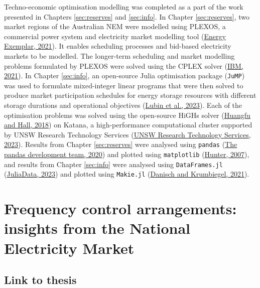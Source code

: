 \documentclass[12pt,a4paper,]{report}
\begin{document}
Techno-economic optimisation modelling was completed as a part of the
work presented in Chapters \ref{sec:reserves} and \ref{sec:info}. In
Chapter \ref{sec:reserves}, two market regions of the Australian NEM
were modelled using PLEXOS, a commercial power system and electricity
market modelling tool
(\protect\hyperlink{ref-energyexemplarPLEXOSEnergyMarket2021}{Energy
Exemplar, 2021}). It enables scheduling processes and bid-based
electricity markets to be modelled. The longer-term scheduling and
market modelling problems formulated by PLEXOS were solved using the
CPLEX solver (\protect\hyperlink{ref-ibmCPLEXOptimizer2021}{IBM, 2021}).
In Chapter \ref{sec:info}, an open-source Julia optimisation package
(\texttt{JuMP}) was used to formulate mixed-integer linear programs that
were then solved to produce market participation schedules for energy
storage resources with different storage durations and operational
objectives
(\protect\hyperlink{ref-lubinJuMPRecentImprovements2023}{Lubin et al.,
2023}). Each of the optimisation problems was solved using the
open-source HiGHs solver
(\protect\hyperlink{ref-huangfuParallelizingDualRevised2018}{Huangfu and
Hall, 2018}) on Katana, a high-performance computational cluster
supported by UNSW Research Technology Services
(\protect\hyperlink{ref-unswresearchtechnologyservicesKatana2023}{UNSW
Research Technology Services, 2023}). Results from Chapter
\ref{sec:reserves} were analysed using \texttt{pandas}
(\protect\hyperlink{ref-reback2020pandas}{The pandas development team,
2020}) and plotted using \texttt{matplotlib}
(\protect\hyperlink{ref-hunterMatplotlib2DGraphics2007}{Hunter, 2007}),
and results from Chapter \ref{sec:info} were analysed using
\texttt{DataFrames.jl}
(\protect\hyperlink{ref-juliadataDataFramesJl2023}{JuliaData, 2023}) and
plotted using \texttt{Makie.jl}
(\protect\hyperlink{ref-danischMakieJlFlexible2021}{Danisch and
Krumbiegel, 2021}).

\hypertarget{sec:fcs}{%
\chapter{Frequency control arrangements: insights from the National
Electricity Market}\label{sec:fcs}}

\hypertarget{link-to-thesis}{%
\section{Link to thesis}\label{link-to-thesis}}
\end{document}
